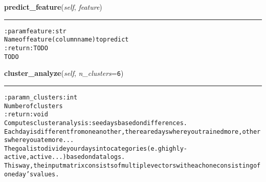     \label{pygce:analysis:models:TimelineDataAnalysis:predict_feature}

    \vspace{0.5ex}

\hspace{.8\funcindent}\begin{boxedminipage}{\funcwidth}

    \raggedright \textbf{predict\_feature}(\textit{self}, \textit{feature})

    \vspace{-1.5ex}

    \rule{\textwidth}{0.5\fboxrule}
\setlength{\parskip}{2ex}
\begin{alltt}

:param feature: str
    Name of feature (column name) to predict
:return: TODO
    TODO
\end{alltt}

\setlength{\parskip}{1ex}
    \end{boxedminipage}

    \label{pygce:analysis:models:TimelineDataAnalysis:cluster_analyze}

    \vspace{0.5ex}

\hspace{.8\funcindent}\begin{boxedminipage}{\funcwidth}

    \raggedright \textbf{cluster\_analyze}(\textit{self}, \textit{n\_clusters}={\tt 6})

    \vspace{-1.5ex}

    \rule{\textwidth}{0.5\fboxrule}
\setlength{\parskip}{2ex}
\begin{alltt}

:param n\_clusters: int
    Number of clusters
:return: void
    Computes cluster analysis: see days based on differences.
    Each day is different from one another, there are days where you trained more, others where you ate more ...
    The goal is to divide your days into categories (e.g highly-active, active ...) based on data logs.
    This way, the input matrix consists of multiple vectors with each one consisting of one day's values.
\end{alltt}

\setlength{\parskip}{1ex}
    \end{boxedminipage}


